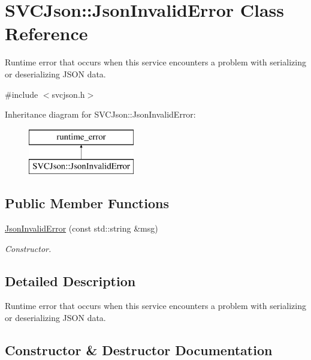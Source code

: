 \hypertarget{class_s_v_c_json_1_1_json_invalid_error}{}\section{S\+V\+C\+Json\+::Json\+Invalid\+Error Class Reference}
\label{class_s_v_c_json_1_1_json_invalid_error}


Runtime error that occurs when this service encounters a problem with serializing or deserializing J\+S\+ON data.  




{\ttfamily \#include $<$svcjson.\+h$>$}

Inheritance diagram for S\+V\+C\+Json\+::Json\+Invalid\+Error\+:\begin{figure}[H]
\begin{center}
\leavevmode
\includegraphics[height=2.000000cm]{class_s_v_c_json_1_1_json_invalid_error}
\end{center}
\end{figure}
\subsection*{Public Member Functions}
\begin{DoxyCompactItemize}
\item 
\mbox{\hyperlink{class_s_v_c_json_1_1_json_invalid_error_a96b4edebbe998f01c1143f55fb098e3f}{Json\+Invalid\+Error}} (const std\+::string \&msg)
\begin{DoxyCompactList}\small\item\em Constructor. \end{DoxyCompactList}\end{DoxyCompactItemize}


\subsection{Detailed Description}
Runtime error that occurs when this service encounters a problem with serializing or deserializing J\+S\+ON data. 



\subsection{Constructor \& Destructor Documentation}
\mbox{\label{class_s_v_c_json_1_1_json_invalid_error_a96b4edebbe998f01c1143f55fb098e3f}} 
